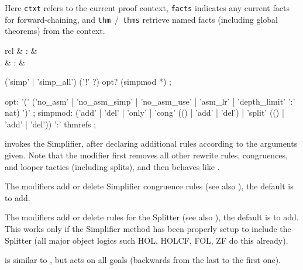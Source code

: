 \begin{isabellebody}
\begin{isamarkuptext}
\begin{descr}
  Here \verb|ctxt| refers to the current proof context, \verb|facts| indicates any current facts for forward-chaining, and \verb|thm|~/~\verb|thms| retrieve named facts (including global theorems)
  from the context.

  \end{descr}%
\end{isamarkuptext}%
\isamarkuptrue%
%
\isamarkuptrue%
%
\isamarkuptrue%
%
\begin{isamarkuptext}%
\begin{matharray}{rcl}
    \mbox{} & : & \isarmeth \\
    \mbox{} & : & \isarmeth \\
  \end{matharray}

  \begin{rail}
    ('simp' | 'simp\_all') ('!' ?) opt? (simpmod *)
    ;

    opt: '(' ('no\_asm' | 'no\_asm\_simp' | 'no\_asm\_use' | 'asm\_lr' | 'depth\_limit' ':' nat) ')'
    ;
    simpmod: ('add' | 'del' | 'only' | 'cong' (() | 'add' | 'del') |
      'split' (() | 'add' | 'del')) ':' thmrefs
    ;
  \end{rail}

  \begin{descr}

  \item [\mbox{\isa{simp}}] invokes the Simplifier, after declaring
  additional rules according to the arguments given.  Note that the
   modifier first removes all other rewrite rules,
  congruences, and looper tactics (including splits), and then behaves
  like .

  \medskip The  modifiers add or delete Simplifier
  congruence rules (see also \cite{isabelle-ref}), the default is to
  add.

  \medskip The  modifiers add or delete rules for the
  Splitter (see also \cite{isabelle-ref}), the default is to add.
  This works only if the Simplifier method has been properly setup to
  include the Splitter (all major object logics such HOL, HOLCF, FOL,
  ZF do this already).

  \item [\mbox{\isa{simp{\isacharunderscore}all}}] is similar to \mbox{}, but acts on
  all goals (backwards from the last to the first one).


\end{descr}
\end{isamarkuptext}
\end{isabellebody}
